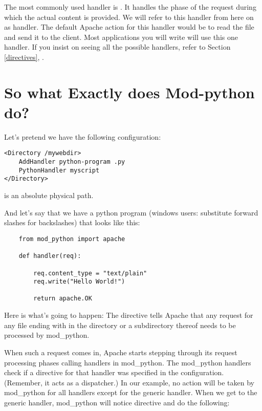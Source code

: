 The most commonly used handler is . It handles the
phase of the request during which the actual content is provided. We
will refer to this handler from here on as  handler. The
default Apache action for this handler would be to read the file and
send it to the client. Most applications you will write will use this
one handler. If you insist on seeing all the possible handlers, refer
to Section \ref{directives}, .

\section{So what Exactly does Mod-python do?\label{tut-what-it-do}}

Let's pretend we have the following configuration: 
\begin{verbatim}
<Directory /mywebdir>
    AddHandler python-program .py
    PythonHandler myscript
</Directory>
\end{verbatim}

  is an absolute physical path. 

And let's say that we have a python program (windows users: substitute
forward slashes for backslashes)  that looks like
this:

\begin{verbatim}
    from mod_python import apache

    def handler(req):

        req.content_type = "text/plain"
        req.write("Hello World!")

        return apache.OK
\end{verbatim}    

Here is what's going to happen: The  directive tells
Apache that any request for any file ending with  in the
 directory or a subdirectory thereof needs to be
processed by mod_python.

When such a request comes in, Apache starts stepping through its
request processing phases calling handlers in mod_python. The
mod_python handlers check if a directive for that handler was
specified in the configuration. (Remember, it acts as a dispatcher.)
In our example, no action will be taken by mod_python for
all handlers except for the generic handler. When we get to the
generic handler, mod_python will notice  directive and do the following:

